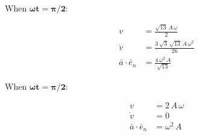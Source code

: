 \documentclass[12pt, letterpaper]{../assignment}
\begin{document}
When $\bm{\omega t = \pi/2}$:

\begin{answer}
\begin{equation*}
    \begin{aligned}
    v &= \frac{\sqrt{13}\,A\,\omega }{2} \\
    \dot{v} &= \frac{3\,\sqrt{3}\,\sqrt{13}\,A\,\omega ^2}{26} \\    
    \bar{a} \cdot \bar{e}_n &= {\frac{4\,\omega ^2\,A}{\sqrt{13}}}
    \end{aligned}
\end{equation*}
\end{answer}

When $\bm{\omega t = \pi/2}$:

\begin{answer}
\begin{equation*}
    \begin{aligned}
    v &= 2\,A\,\omega \\
    \dot{v} &= 0 \\    
    \bar{a} \cdot \bar{e}_n &= {\omega ^2\,{A}}
    \end{aligned}
\end{equation*}
\end{answer}



\end{document}
